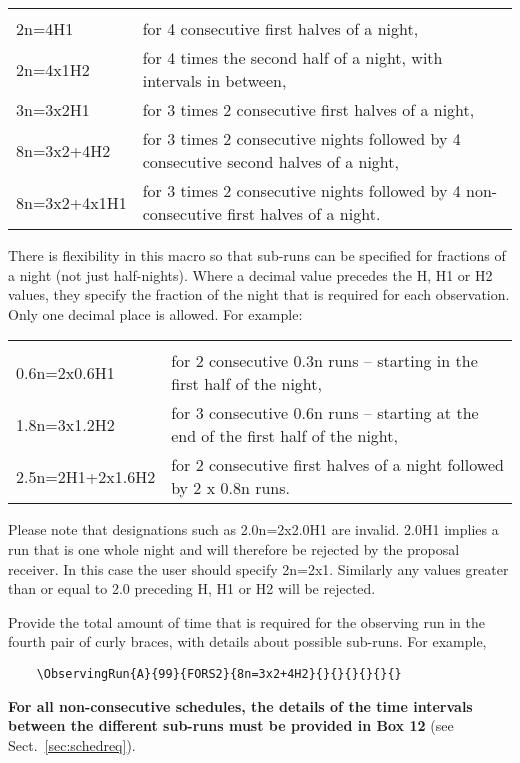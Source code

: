 \documentclass{article}
\begin{document}
\begin{tabular}{ll}
& \\
2n=4H1     & for 4 consecutive first halves of a night, \\
2n=4x1H2   & for 4 times the second half of a night, with intervals in between,\\   
3n=3x2H1  & for 3 times 2 consecutive first halves of a night, \\   
8n=3x2+4H2& for 3 times 2 consecutive nights followed by 4 consecutive second halves of a night, \\
8n=3x2+4x1H1& for 3 times 2 consecutive nights followed by 4 non-consecutive first halves of a night. \\
\end{tabular}

\bigskip

There is flexibility in this macro so that sub-runs
can be specified for fractions of a night  (not just half-nights).
Where a decimal value precedes the H, H1 or H2 values, they specify the
fraction of the night that is required for each observation. Only
one decimal place is allowed.
For example:

\begin{tabular}{ll}
& \\
0.6n=2x0.6H1     & for 2 consecutive 0.3n runs -- starting in the first half of the night, \\
1.8n=3x1.2H2    & for  3 consecutive 0.6n runs -- starting at the end of the first half of the night, \\
2.5n=2H1+2x1.6H2 & for 2 consecutive first halves of a night followed by 2 x 0.8n runs.\\
\end{tabular}

Please note that designations such as 2.0n=2x2.0H1 are invalid. 2.0H1 implies a run that is one whole night and will therefore be rejected by the proposal receiver.
In this case the user should specify 2n=2x1.
Similarly any values greater than or equal to 2.0 preceding
H, H1 or H2 will be rejected.

\bigskip

Provide the total amount of time
that is required for the observing run in the fourth pair of curly braces, with details about
possible sub-runs.  For example,

\begin{verbatim}
    \ObservingRun{A}{99}{FORS2}{8n=3x2+4H2}{}{}{}{}{}{}
\end{verbatim}
{\bf For all non-consecutive schedules, the details of the time
  intervals between the different sub-runs must be provided in Box
  12} (see Sect.~\ref{sec:schedreq}). \\
\end{document}
